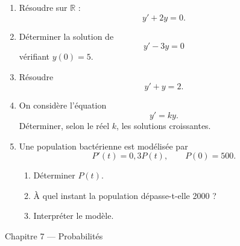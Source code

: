 \documentclass[11pt,a4paper]{article}
\newcommand{\R}{\mathbb{R}}
\begin{document}
\begin{enumerate}[label=\textbf{Exercice \arabic*.}, leftmargin=*, itemsep=1em]

\item Résoudre sur \(\R\) :
\[
y'+2y=0.
\]

\item Déterminer la solution de
\[
y'-3y=0
\]
vérifiant \(y(0)=5\).

\item Résoudre
\[
y'+y=2.
\]

\item On considère l'équation
\[
y'=ky.
\]
Déterminer, selon le réel \(k\), les solutions croissantes.

\item Une population bactérienne est modélisée par
\[
P'(t)=0{,}3P(t),\qquad P(0)=500.
\]

\begin{enumerate}[label=\alph*)]
    \item Déterminer \(P(t)\).
    \item À quel instant la population dépasse-t-elle 2000 ?
    \item Interpréter le modèle.
\end{enumerate}

\end{enumerate}

\begin{chapitrebox}{Chapitre 7 --- Probabilités}
\end{chapitrebox}
\end{document}
